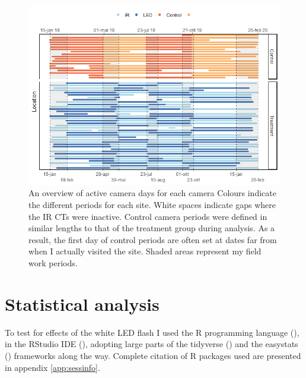 \begin{figure}
		\centering
		\includegraphics[scale=.8]{../R/FLM_notebook_files/figure-gfm/effort-facet-1.png}	
\caption[An overview of active camera days]
{An overview of active camera days for each camera %
Colours indicate the different periods for each site. White spaces indicate gaps where the IR CTs were inactive. Control camera periods were defined in similar lengths to that of the treatment group during analysis. As a result, the first day of control periods are often set at dates far from when I actually visited the site. Shaded areas represent my field work periods. \label{fig:timeseries}}
\end{figure}




\section{Statistical analysis} %

To test for effects of the white LED flash I used the R programming language (\cite{RCoreTeam2020}), in the RStudio IDE (\cite{RStudioTeam2020a}), adopting large parts of the tidyverse (\cite{tidyverse}) and the easystats (\cite{easystats}) frameworks along the way. Complete citation of R packages used are presented in appendix \ref{app:sessinfo}. 


